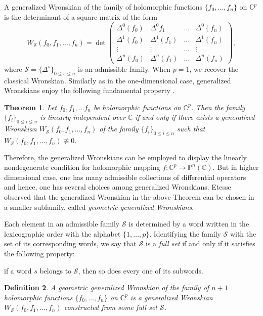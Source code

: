 \documentclass[english, 12pt]{amsart}
\theoremstyle{plain}
\newtheorem{thm}{Theorem}[section]
\newtheorem{defi}[thm]{Definition}
\theoremstyle{remark}
\numberwithin{equation}{section}
\theoremstyle{plain}
\theoremstyle{named}
\begin{document}
A generalized Wronskian of the family of holomorphic functions $\{f_0,\dots,f_n\}$ on $\mathbb{C}^p$ is the determinant of a square matrix of the form
$$
W_{\mathcal{S}}(f_0,f_1,\dots,f_n)
=
\det
\begin{pmatrix}
\Delta^0 (f_0)&\Delta^0{f_1}&\dots&\Delta^0(f_n)\\
\Delta^1(f_0)&\Delta^1(f_1)&\dots&\Delta^1(f_n)\\
\vdots&\vdots&\dots&\vdots\\
\Delta^n(f_0)&\Delta^n(f_1)&\dots&\Delta^n(f_n)
\end{pmatrix},
$$
where $\mathcal{S}=\{\Delta^s\}_{0\leq s\leq n}$ is an admissible family. When $p=1$, we recover the classical Wronskian. Similarly as in the one-dimensional case, generalized Wronskians enjoy the following fundamental property \cite{Rot55,Fujimoto1985,Schmidt1980,BD2010}.
\begin{thm}
\label{fundamental property of generalized wronskian about linearly independent}
Let $f_0,f_1,\dots f_n$ be holomorphic functions on $\mathbb{C}^p$. Then the family $\{f_i\}_{0\leq i\leq n}$ is linearly independent over $\mathbb{C}$ if and only if there exists a generalized Wronskian $W_{\mathcal{S}}(f_0,f_1,\dots,f_n)$ of the family $\{f_i\}_{0\leq i\leq n}$ such that $W_{\mathcal{S}}(f_0,f_1,\dots,f_n)\not\equiv 0$.
\end{thm}
Therefore, the generalized Wronskians can be employed to display the linearly nondegenerate condition for holomorphic mapping $f\colon\mathbb{C}^p\rightarrow\mathbb{P}^n(\mathbb{C})$. But in higher dimensional case, one has many admissible collections of differential operators and hence, one has several choices among generalized Wronskians. Etesse \cite[Theorem 1.4.1]{Etesse2023} observed that  the generalized Wronskian in the above  Theorem can be chosen in  a smaller subfamily, called {\sl geometric generalized Wronskians}. 

Each element in an admissible family $\mathcal{S}$ is determined by a word written in the lexicographic order with the alphabet $\{1,\dots,p\}$. Identifying the family $\mathcal{S}$ with the set of its corresponding words, we say that $\mathcal{S}$ is a {\sl full set} if and only if it satisfies the following property:

\begin{center}
	if a word $s$ belongs to $\mathcal{S}$, then so does every one of its subwords.
\end{center}

\begin{defi} A geometric generalized Wronskian of the family of $n+1$ holomorphic functions $\{f_0,\dots,f_n\}$ on $\mathbb{C}^p$ is a generalized Wronskian $W_{\mathcal{S}}(f_0,f_1,\dots,f_n)$ constructed from some full set $\mathcal{S}$.	
\end{defi}
\end{document}

